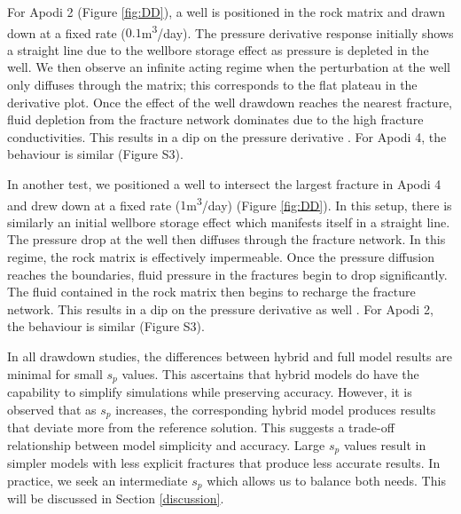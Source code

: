 \documentclass[draft]{agujournal2018}
\begin{document}
For Apodi 2 (Figure \ref{fig:DD}), a well is positioned in the rock matrix and drawn down at a fixed rate ($0.1$m\textsuperscript{3}/day). The pressure derivative response initially shows a straight line due to the wellbore storage effect as pressure is depleted in the well. We then observe an infinite acting regime when the perturbation at the well only diffuses through the matrix; this corresponds to the flat plateau in the derivative plot. Once the effect of the well drawdown reaches the nearest fracture, fluid depletion from the fracture network dominates due to the high fracture conductivities. This results in a dip on the pressure derivative \citep{Bourdet1989, Egya2018}. For Apodi 4, the behaviour is similar (Figure S3).

In another test, we positioned a well to intersect the largest fracture in Apodi 4 and drew down at a fixed rate ($1$m\textsuperscript{3}/day) (Figure \ref{fig:DD}). In this setup, there is similarly an initial wellbore storage effect which manifests itself in a straight line. The pressure drop at the well then diffuses through the fracture network. In this regime, the rock matrix is effectively impermeable. Once the pressure diffusion reaches the boundaries, fluid pressure in the fractures begin to drop significantly. The fluid contained in the rock matrix then begins to recharge the fracture network. This results in a dip on the pressure derivative as well \citep{Gringarten1987}. For Apodi 2, the behaviour is similar (Figure S3).

In all drawdown studies, the differences between hybrid and full model results are minimal for small $s_p$ values. This ascertains that hybrid models do have the capability to simplify simulations while preserving accuracy. However, it is observed that as $s_p$ increases, the corresponding hybrid model produces results that deviate more from the reference solution. This suggests a trade-off relationship between model simplicity and accuracy. Large $s_p$ values result in simpler models with less explicit fractures that produce less accurate results. In practice, we seek an intermediate $s_p$ which allows us to balance both needs. This will be discussed in Section \ref{discussion}.
\end{document}
